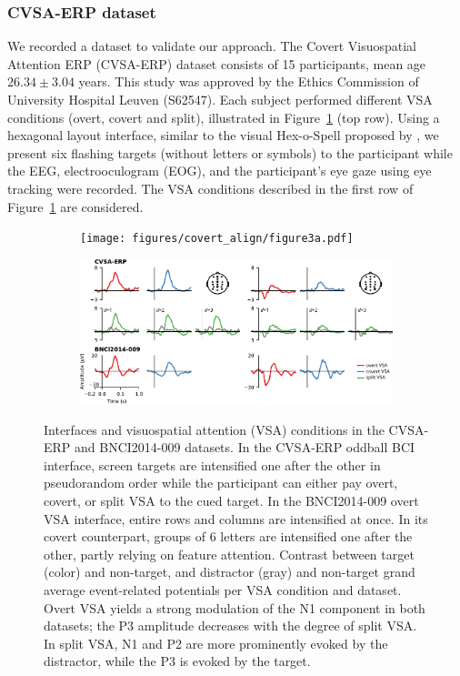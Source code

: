 \subsubsection{CVSA-ERP dataset}

We recorded a dataset to validate our approach.
The Covert Visuospatial Attention ERP (CVSA-ERP) dataset
consists of 15 participants, mean age $26.34\pm3.04$ years.
This study was approved by the Ethics Commission of University Hospital Leuven
(S62547).
Each subject performed different VSA conditions (overt, covert and split),
illustrated in Figure~\ref{fig:interface} (top row).
Using a hexagonal layout interface, similar to the visual Hex-o-Spell proposed
by \cite{Treder2010}, we present six flashing targets (without letters or
symbols) to the participant while the EEG, electrooculogram (EOG), and the
participant's eye gaze using eye tracking were recorded.
The VSA conditions described in the first row of Figure~\ref{fig:interface} are
considered.
\begin{figure}
  \bigskip
	\begin{subfigure}{\linewidth}
		\caption{}
		\label{fig:interface}
		\texttt{[image: figures/covert\_align/figure3a.pdf]}
	\end{subfigure}

	\bigskip
	\bigskip
	\begin{subfigure}{\linewidth}
		\caption{}
		\label{fig:erps}
		\includegraphics[width=\linewidth]{figures/covert_align/figure3b.pdf}
	\end{subfigure}%

	\caption{
		 Interfaces and visuospatial attention (VSA)
    conditions in the CVSA-ERP and BNCI2014-009 datasets.
		In the CVSA-ERP oddball BCI interface, screen targets are intensified one after
    the other in pseudorandom order while the participant can either pay overt,
    covert, or split VSA to the cued target.
		In the BNCI2014-009 overt VSA interface, entire rows and columns are
		intensified at once. In its covert counterpart,
		groups of 6 letters are intensified one after the other, partly relying on
    feature attention.
		 Contrast between target (color) and non-target, and
    distractor (gray) and non-target grand average event-related potentials per VSA condition and dataset.
    Overt VSA yields a strong modulation of the N1 component in both datasets;
    the P3 amplitude decreases with the degree of split VSA.
    In split VSA, N1 and P2 are more prominently evoked by the distractor,
    while the P3 is evoked by the target.
	}
\end{figure}

